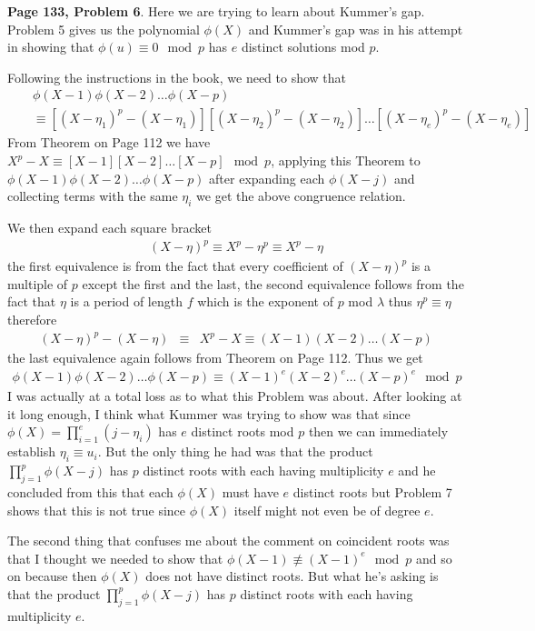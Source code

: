 \documentclass[aps,preprint,preprintnumbers,nofootinbib,showpacs,prd]{revtex4-1}
\newcommand{\nbea}{\begin{eqnarray*}}
\newcommand{\neea}{\end{eqnarray*}}
\begin{document}
{\bf Page 133, Problem 6}. Here we are trying to learn about Kummer's gap. Problem 5 gives us the polynomial $\phi(X)$ and Kummer's gap was in his attempt in showing that $\phi(u) \equiv 0 \mod{p}$ has $e$ distinct solutions mod $p$.

Following the instructions in the book, we need to show that
%
\nbea
&& \phi(X - 1)\phi(X - 2) \dots \phi(X - p) \\
&& \equiv \left\lbrack(X - \eta_1)^p - (X - \eta_1)\right\rbrack \left\lbrack(X - \eta_2)^p - (X - \eta_2)\right\rbrack \dots \left\lbrack(X - \eta_e)^p - (X - \eta_e)\right\rbrack
\neea
%
From Theorem on Page 112 we have $X^p - X \equiv [X - 1][X - 2] \dots [X - p] \mod{p}$, applying this Theorem to $\phi(X - 1)\phi(X - 2) \dots \phi(X - p)$ after expanding each $\phi(X - j)$ and collecting terms with the same $\eta_i$ we get the above congruence relation.

We then expand each square bracket
%
\nbea
(X - \eta)^p \equiv X^p - \eta^p \equiv X^p - \eta
\neea
%
the first equivalence is from the fact that every coefficient of $(X - \eta)^p$ is a multiple of $p$ except the first and the last, the second equivalence follows from the fact that $\eta$ is a period of length $f$ which is the exponent of $p$ mod $\lambda$ thus $\eta^p \equiv \eta$ therefore
%
\nbea
(X - \eta)^p - (X - \eta) & \equiv & X^p - X \equiv (X - 1)(X - 2) \dots (X - p)
\neea
%
the last equivalence again follows from Theorem on Page 112. Thus we get
%
\nbea
\phi(X - 1)\phi(X - 2) \dots \phi(X - p) \equiv (X - 1)^e(X - 2)^e \dots (X - p)^e \mod {p}
\neea
%
I was actually at a total loss as to what this Problem was about. After looking at it long enough, I think what Kummer was trying to show was that since $\phi(X) = \prod_{i=1}^{e}(j - \eta_i)$ has $e$ distinct roots mod $p$ then we can immediately establish $\eta_i \equiv u_i$. But the only thing he had was that the product $\prod_{j=1}^{p} \phi(X - j)$ has $p$ distinct roots with each having multiplicity $e$ and he concluded from this that each $\phi(X)$ must have $e$ distinct roots but Problem 7 shows that this is not true since $\phi(X)$ itself might not even be of degree $e$.

The second thing that confuses me about the comment on coincident roots was that I thought we needed to show that $\phi(X - 1) \not\equiv (X - 1)^e \mod{p}$ and so on because then $\phi(X)$ does not have distinct roots. But what he's asking is that the product $\prod_{j=1}^{p} \phi(X - j)$ has $p$ distinct roots with each having multiplicity $e$.
\end{document}
